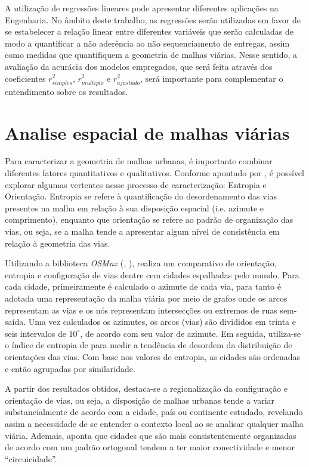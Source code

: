 A utilização de regressões lineares pode apresentar diferentes aplicações na Engenharia.
No âmbito deste trabalho, as regressões serão utilizadas em favor de se estabelecer a relação linear entre diferentes variáveis que serão calculadas de modo a quantificar a não aderência ao não sequenciamento de entregas, assim como medidas que quantifiquem a geometria de malhas viárias.
Nesse sentido, a avaliação da acurácia dos modelos empregados, que será feita através dos coeficientes $r^{2}_{simples}$, $r^{2}_{multiplo}$ e $r^{2}_{ajustado}$, será importante para complementar o entendimento sobre os resultados.


\section{Analise espacial de malhas viárias} \label{sec:boeingRevBib}

Para caracterizar a geometria de malhas urbanas, é importante combinar diferentes fatores quantitativos e qualitativos.
Conforme apontado por , é possível explorar algumas vertentes nesse processo de caracterização: Entropia e Orientação.
Entropia se refere à quantificação do desordenamento das vias presentes na malha em relação à sua disposição espacial (i.e. azimute e comprimento), enquanto que orientação se refere ao padrão de organização das vias, ou seja, se a malha tende a apresentar algum nível de consistência em relação à geometria das vias.

Utilizando a biblioteca \textit{OSMnx} (, \citeyear{BOEING2017126}),  realiza um comparativo de orientação, entropia e configuração de vias dentre cem cidades espalhadas pelo mundo.
Para cada cidade, primeiramente é calculado o azimute de cada via, para tanto é adotada uma representação da malha viária por meio de grafos onde os arcos representam as vias e os nós representam intersecções ou extremos de ruas sem-saída. 
Uma vez calculados os azimutes, os arcos (vias) são divididos em trinta e seis intervalos de $10^{\circ}$, de acordo com seu valor de azimute.
Em seguida, utiliza-se o índice de entropia de  para medir a tendência de desordem da distribuição de orientações das vias. 
Com base nos valores de entropia, as cidades são ordenadas e então agrupadas por similaridade. 

A partir dos resultados obtidos, destaca-se a regionalização da configuração e orientação de vias, ou seja, a disposição de malhas urbanas tende a variar substancialmente de acordo com a cidade, país ou continente estudado, revelando assim a necessidade de se entender o contexto local ao se analisar qualquer malha viária.
Ademais,  aponta que cidades que são mais consistentemente organizadas de acordo com um padrão ortogonal tendem a ter maior conectividade e menor ``circuicidade''.

